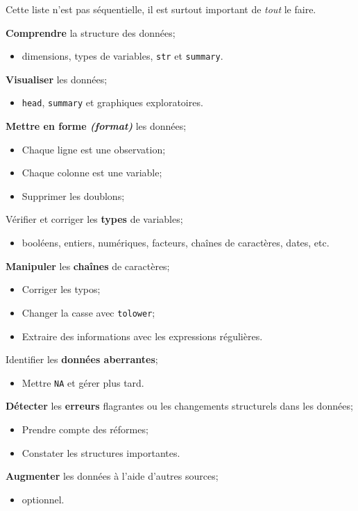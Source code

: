 \documentclass[10pt, french]{article}
\begin{document}
\begin{multicols*}{3}
\begin{algo2}
Cette liste n'est pas séquentielle, il est surtout important de \textit{tout} le faire.
\begin{todolist}[leftmargin = *]
	\item	\textbf{Comprendre} la structure des données;
		\begin{itemize}
		\item	dimensions, types de variables, \texttt{str} et \texttt{summary}.
		\end{itemize}
	\item	\textbf{Visualiser} les données;
		\begin{itemize}
		\item	\texttt{head}, \texttt{summary} et graphiques exploratoires.
		\end{itemize}
	\item	\textbf{Mettre en forme \textit{(format)}} les données;
		\begin{itemize}
		\item	Chaque ligne est une observation;
		\item	Chaque colonne est une variable;
		\item	Supprimer les doublons;
		\end{itemize}
	\item	Vérifier et corriger les \textbf{types} de variables;
		\begin{itemize}
		\item	booléens, entiers, numériques, facteurs, chaînes de caractères, dates, etc.
		\end{itemize}
	\item	\textbf{Manipuler} les \textbf{chaînes} de caractères;
		\begin{itemize}
		\item	Corriger les typos;
		\item	Changer la casse avec \texttt{tolower};
		\item	Extraire des informations avec les expressions régulières.
		\end{itemize}
	\item	Identifier les \textbf{données aberrantes};
		\begin{itemize}
		\item	Mettre \texttt{NA} et gérer plus tard.
		\end{itemize}
	\item	\textbf{Détecter} les \textbf{erreurs} flagrantes ou les changements structurels dans les données;
		\begin{itemize}
		\item	Prendre compte des réformes;
		\item	Constater les structures importantes.
		\end{itemize}
	\item	\textbf{Augmenter} les données à l'aide d'autres sources;
		\begin{itemize}
		\item	optionnel.
		\end{itemize}
\end{todolist}
\end{algo2}


\end{multicols*}
\end{document}
